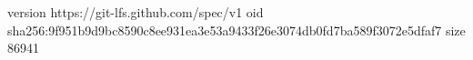 version https://git-lfs.github.com/spec/v1
oid sha256:9f951b9d9bc8590c8ee931ea3e53a9433f26e3074db0fd7ba589f3072e5dfaf7
size 86941
